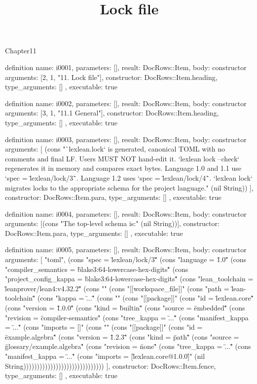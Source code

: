 \begin{lexlean}{Chapter11}
\title{Lock file}
\begin{semanticmodule}
definition{
  name: i0001,
  parameters: [],
  result: DocRows::Item,
  body: constructor{
    arguments: [2, 1, "11. Lock file"],
    constructor: DocRows::Item.heading,
    type_arguments: []
  },
  executable: true
}

definition{
  name: i0002,
  parameters: [],
  result: DocRows::Item,
  body: constructor{
    arguments: [3, 1, "11.1 General"],
    constructor: DocRows::Item.heading,
    type_arguments: []
  },
  executable: true
}

definition{
  name: i0003,
  parameters: [],
  result: DocRows::Item,
  body: constructor{
    arguments: [
      (cons "`lexlean.lock` is generated, canonical TOML with no comments and final LF. Users MUST NOT hand-edit it. `lexlean lock --check` regenerates it in memory and compares exact bytes. Language 1.0 and 1.1 use `spec = \"lexlean/lock/3\"`. Language 1.2 uses `spec = \"lexlean/lock/4\"`. `lexlean lock` migrates locks to the appropriate schema for the project language." (nil String))
    ],
    constructor: DocRows::Item.para,
    type_arguments: []
  },
  executable: true
}

definition{
  name: i0004,
  parameters: [],
  result: DocRows::Item,
  body: constructor{
    arguments: [(cons "The top-level schema is:" (nil String))],
    constructor: DocRows::Item.para,
    type_arguments: []
  },
  executable: true
}

definition{
  name: i0005,
  parameters: [],
  result: DocRows::Item,
  body: constructor{
    arguments: [
      "toml",
      (cons "spec = \"lexlean/lock/3\"" (cons "language = \"1.0\"" (cons "compiler_semantics = \"blake3:64-lowercase-hex-digits\"" (cons "project_config_kappa = \"blake3:64-lowercase-hex-digits\"" (cons "lean_toolchain = \"leanprover/lean4:v4.32.2\"" (cons "" (cons "[[workspace_file]]" (cons "path = \"lean-toolchain\"" (cons "kappa = \"...\"" (cons "" (cons "[[package]]" (cons "id = \"lexlean.core\"" (cons "version = \"1.0.0\"" (cons "kind = \"builtin\"" (cons "source = \"embedded\"" (cons "revision = \"compiler-semantics\"" (cons "tree_kappa = \"...\"" (cons "manifest_kappa = \"...\"" (cons "imports = []" (cons "" (cons "[[package]]" (cons "id = \"example.algebra\"" (cons "version = \"1.2.3\"" (cons "kind = \"path\"" (cons "source = \"glossary/example.algebra\"" (cons "revision = \"none\"" (cons "tree_kappa = \"...\"" (cons "manifest_kappa = \"...\"" (cons "imports = [\"lexlean.core@1.0.0\"]" (nil String))))))))))))))))))))))))))))))
    ],
    constructor: DocRows::Item.fence,
    type_arguments: []
  },
  executable: true
}


\end{semanticmodule}
\end{lexlean}
